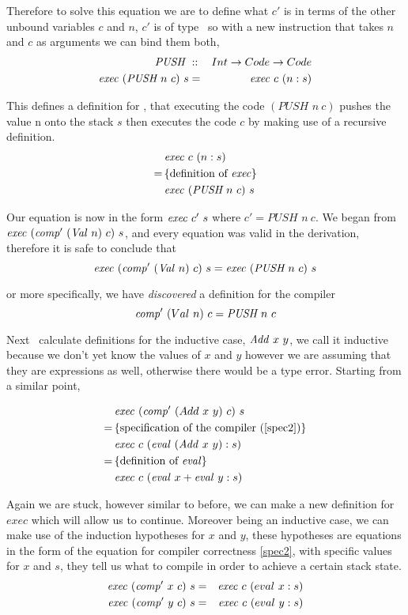 \documentclass {article}
\begin{document}
Therefore to solve this equation we are to
define what $c'$ is in terms of 
the other unbound variables $c$ and $n$,
$c'$ is of  type \code\ 
so with a new instruction that takes $n$
and $c$ as arguments we can bind them both\cite[bottom of page 9]{bandh},
\newcommand{\PUSH}{\textit{PUSH\ }}
\begin{eqnarray}
\PUSH &::& Int \rightarrow Code \rightarrow Code \nonumber \\
\Exec (\PUSH n\ c)\ s &=& \Exec c\ (n :s)
\end{eqnarray}

This defines a definition for \exec, 
that executing the code \( (\PUSH n\ c) \) 
pushes the value n onto the stack $s$
then executes the code $c$ by making use of 
a recursive definition.
\begin{align*}
&\Exec c\ (n:s) \\
=\, & \{\mbox{definition of \exec}\} \\
&\Exec  (\PUSH n\ c)\ s
\end{align*}

Our equation is now in the form $\Exec c'\ s$
where $c' = \PUSH n\ c$. We began from 
\(\Exec (\Compp (\Val n)\ c)\ s \),
and every equation was valid in the derivation,
therefore it is safe to conclude that 
\begin{equation}
\Exec (\Compp (\Val  n)\ c)\ s = \Exec  (\PUSH n\ c)\ s \label{compval}
\end{equation}

\noindent or more specifically, we have \emph{discovered} 
a definition for the compiler
\[ \Compp  (Val\ n)\ c =  \PUSH n\ c \]

Next \BH\ calculate definitions for the inductive case, 
$\mathit{Add\ } x\ y$,
we call it inductive because we don't yet know 
the values of $x$ and $y$ however we are assuming
that they are expressions as well,
otherwise there would be a type error.
Starting from a similar point,

\begin{align*}
&\mathit{exec\ } (\mathit{comp'\ }  (Add\ x\ y)\ c)\ s \\
=\, & \{ \mbox{specification of the compiler (\ref{spec2})} \} \\
&\mathit{exec\ } c\ (\mathit{eval\ } (\mathit{Add\ } x\ y) : s) \\
=\, & \{ \mbox{definition of \textit{eval}} \} \\
&\mathit{exec\ } c\ (\mathit{eval\ } x + \mathit{eval\ } y :s)
\end{align*}

Again we are stuck, however similar to before, 
we can make a new definition for $exec$ which 
will allow us to continue.
Moreover being an inductive case, 
we can make use of the induction 
hypotheses for $x$ and $y$,
these hypotheses are equations in the form
of the equation for compiler correctness \ref{spec2},
with specific values for $x$ and $s$,
they tell us what to compile in order to achieve
a certain stack state.
\begin{eqnarray}
\mathit{exec\ } (\mathit{comp'\ }  x\ c)\ s &=& \mathit{exec\ } c\ (eval\ x:s) \label{iniduc1}\\
\mathit{exec\ } (\mathit{comp'\ }  y\ c)\ s &=& \mathit{exec\ } c\ (eval\ y:s) \label{iniduc2}
\end{eqnarray}
\end{document}
